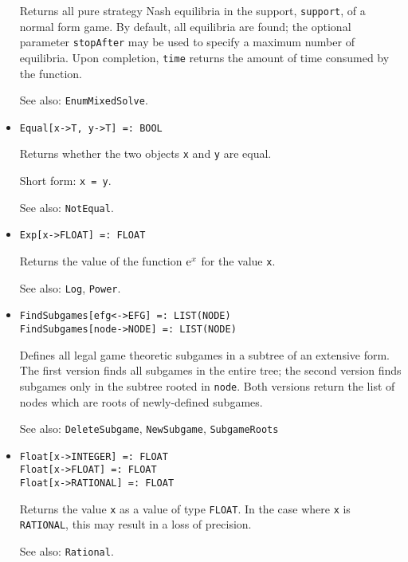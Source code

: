 \begin{itemize}
\bd
Returns all pure strategy Nash equilibria in the support, \verb+support+,
of a normal form game.  By default, all equilibria are found; the optional
parameter \verb+stopAfter+ may be used to specify a maximum number of
equilibria.  Upon completion, \verb+time+ returns the amount of time
consumed by the function. 
\item
[See also:] {\tt EnumMixedSolve}.
\ed

\item
\protect \large \begin{verbatim}
Equal[x->T, y->T] =: BOOL
\end{verbatim}\normalsize

\bd
Returns whether the two objects \verb+x+ and \verb+y+ are
equal.
\item
[Short form:] \verb+x = y+.
\item
[See also:] {\tt NotEqual}.
\ed

\item
\protect \large \begin{verbatim}
Exp[x->FLOAT] =: FLOAT
\end{verbatim} \normalsize

\bd
Returns the value of the function ${\rm e}^{x}$ for the
value \verb+x+.
\item
[See also:] {\tt Log}, {\tt Power}.
\ed



\item
\protect \large \begin{verbatim}
FindSubgames[efg<->EFG] =: LIST(NODE)
FindSubgames[node->NODE] =: LIST(NODE)
\end{verbatim} \normalsize

\bd
Defines all legal game theoretic subgames in a subtree of an extensive
form.  The first version finds all subgames in the entire tree; the
second version finds subgames only in the subtree rooted in \verb+node+.
Both versions return the list of nodes which are roots of newly-defined
subgames.
\item
[See also:] {\tt DeleteSubgame}, {\tt NewSubgame}, {\tt SubgameRoots}
\ed

\item
\protect \large \begin{verbatim}
Float[x->INTEGER] =: FLOAT
Float[x->FLOAT] =: FLOAT
Float[x->RATIONAL] =: FLOAT
\end{verbatim} \normalsize

\bd
Returns the value \verb+x+ as a value of type {\tt FLOAT}.
In the case where \verb+x+ is {\tt RATIONAL}, this may result in a loss
of precision.
\item
[See also:] {\tt Rational}.
\ed


\end{itemize}
